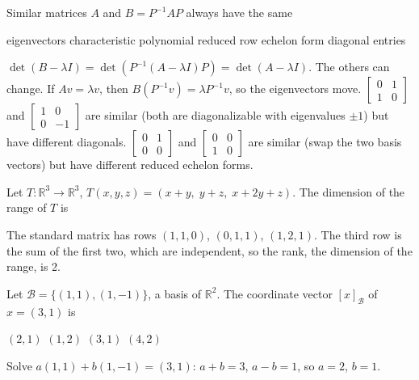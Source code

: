 \begin{question}[id=lt-6]
Similar matrices $A$ and $B = P^{-1}AP$ always have the same
\begin{options}
  \option eigenvectors
  \correct characteristic polynomial
  \option reduced row echelon form
  \option diagonal entries
\end{options}
\begin{solution}
$\det(B - \lambda I) = \det(P^{-1}(A - \lambda I)P) = \det(A - \lambda I)$. The others can change. If $Av = \lambda v$, then $B(P^{-1}v) = \lambda P^{-1}v$, so the eigenvectors move. $\begin{bmatrix} 0 & 1 \\ 1 & 0 \end{bmatrix}$ and $\begin{bmatrix} 1 & 0 \\ 0 & -1 \end{bmatrix}$ are similar (both are diagonalizable with eigenvalues $\pm 1$) but have different diagonals. $\begin{bmatrix} 0 & 1 \\ 0 & 0 \end{bmatrix}$ and $\begin{bmatrix} 0 & 0 \\ 1 & 0 \end{bmatrix}$ are similar (swap the two basis vectors) but have different reduced echelon forms.
\end{solution}
\end{question}

\begin{question}[id=lt-7, marks=2]
Let $T : \mathbb{R}^3 \to \mathbb{R}^3$, $T(x, y, z) = (x + y,\; y + z,\; x + 2y + z)$. The dimension of the range of $T$ is
\begin{solution}
The standard matrix has rows $(1,1,0)$, $(0,1,1)$, $(1,2,1)$. The third row is the sum of the first two, which are independent, so the rank, the dimension of the range, is 2.
\end{solution}
\end{question}

\begin{question}[id=lt-8, marks=2]
Let $\mathcal{B} = \{(1, 1), (1, -1)\}$, a basis of $\mathbb{R}^2$. The coordinate vector $[x]_{\mathcal{B}}$ of $x = (3, 1)$ is
\begin{options}
  \correct $(2, 1)$
  \option $(1, 2)$
  \option $(3, 1)$
  \option $(4, 2)$
\end{options}
\begin{solution}
Solve $a(1, 1) + b(1, -1) = (3, 1)$: $a + b = 3$, $a - b = 1$, so $a = 2$, $b = 1$.
\end{solution}
\end{question}

